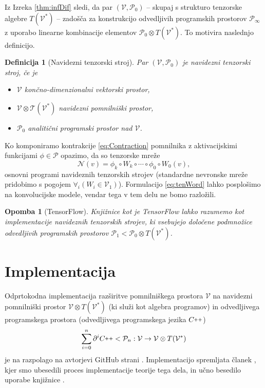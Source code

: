 \documentclass[a4paper, 12pt]{book}
\newcommand{\T}{\mathcal{T}}
\newcommand{\VV}{\mathcal{V}}
\newcommand{\NN}{\mathcal{N}}
\newcommand{\CC}{C\nolinebreak\hspace{-.05em}\raisebox{.4ex}{\tiny\bf +}\nolinebreak\hspace{-.10em}\raisebox{.4ex}{\tiny\bf +}}
\def\CC{{C\nolinebreak[4]\hspace{-.05em}\raisebox{.4ex}{\tiny\bf ++}}}
\newcommand{\dP}{\mathcal{P}}
\newcommand{\D}{\partial}
\newtheorem{opomba}{Opomba}[chapter]
\newtheorem{definicija}{Definicija}[chapter]
\begin{document}
Iz Izreka \ref{thm:infDif} sledi, da par $(\VV, \dP_0)$ -- skupaj s strukturo tenzorske algebre $T(\VV^*)$ -- zadošča za konstrukcijo odvedljivih programskih prostorov $\dP_\infty$ z uporabo linearne kombinacije elementov $\dP_0\otimes T(\VV^*)$. To motivira naslednjo definicijo.
\begin{definicija}[Navidezni tenzorski stroj]
Par $(\VV, \dP_0)$ je \emph{navidezni tenzorski stroj}, če je
\begin{itemize}
    \item
    $\VV$ končno-dimenzionalni vektorski prostor,
    \item
    $\VV\otimes \T(\VV^*)$ navidezni pomnilniški prostor,
    \item
    $\dP_0$ analitični programski prostor nad $\VV$.
    \end{itemize}
\end{definicija}

\noindent Ko komponiramo kontrakcije \eqref{eq:Contraction} pomnilnika z aktivacijskimi funkcijami $\phi\in\dP$ opazimo, da so tenzorske mreže \cite{opCalProg}
\begin{equation} \label{eq:tenWord}
\NN(v)=\phi_k\circ W_k\circ\cdots\circ\phi_0\circ W_0(v),
\end{equation}
osnovni programi navideznih tenzorskih strojev (standardne nevronske mreže pridobimo s pogojem $\forall_i(W_i\in\VV_1)$). Formulacijo \eqref{eq:tenWord} lahko posplošimo na konvolucijske modele, vendar tega v tem delu ne bomo razložili.
\begin{opomba}[TensorFlow]
Knjižnice kot je TensorFlow \cite{TF} lahko razumemo kot implementacije navideznih tenzorskih strojev, ki vsebujejo določene podmnožice odvedljivih programskih prostorov $\dP_1<\dP_0\otimes T(\VV^*)$.
\end{opomba}

\section{Implementacija}\label{sec:implementacija}

Odprtokodna implementacija razširitve pomnilniškega prostora $\VV$ na navidezni pomnilniški prostor $\VV\otimes T(\VV^*)$ (ki služi kot algebra programov) in odvedljivega programskega prostora (odvedljivega programskega jezika $\CC$)
\begin{equation}
\sum\limits_{i=0}^n\D^i\CC<\dP_n:\VV\to\VV\otimes T(\VV^*)
\end{equation}
je na razpolago na avtorjevi GitHub strani \cite{dC++}. Implementacijo spremljata članek \cite{dC++Paper}, kjer smo ubesedili proces implementacije teorije tega dela, in učno besedilo uporabe knjižnice \cite{dC++Man}.
\end{document}
